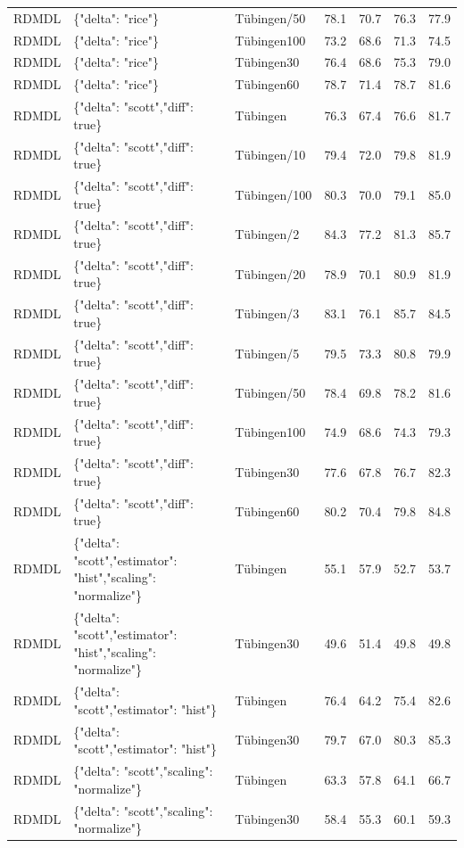 \begin{tabular}{lllllll}
RDMDL & \{"delta": "rice"\} & Tübingen/50 & 78.1 & 70.7 & 76.3 & 77.9 \\
RDMDL & \{"delta": "rice"\} & Tübingen100 & 73.2 & 68.6 & 71.3 & 74.5 \\
RDMDL & \{"delta": "rice"\} & Tübingen30 & 76.4 & 68.6 & 75.3 & 79.0 \\
RDMDL & \{"delta": "rice"\} & Tübingen60 & 78.7 & 71.4 & 78.7 & 81.6 \\
RDMDL & \{"delta": "scott","diff": true\} & Tübingen & 76.3 & 67.4 & 76.6 & 81.7 \\
RDMDL & \{"delta": "scott","diff": true\} & Tübingen/10 & 79.4 & 72.0 & 79.8 & 81.9 \\
RDMDL & \{"delta": "scott","diff": true\} & Tübingen/100 & 80.3 & 70.0 & 79.1 & 85.0 \\
RDMDL & \{"delta": "scott","diff": true\} & Tübingen/2 & 84.3 & 77.2 & 81.3 & 85.7 \\
RDMDL & \{"delta": "scott","diff": true\} & Tübingen/20 & 78.9 & 70.1 & 80.9 & 81.9 \\
RDMDL & \{"delta": "scott","diff": true\} & Tübingen/3 & 83.1 & 76.1 & 85.7 & 84.5 \\
RDMDL & \{"delta": "scott","diff": true\} & Tübingen/5 & 79.5 & 73.3 & 80.8 & 79.9 \\
RDMDL & \{"delta": "scott","diff": true\} & Tübingen/50 & 78.4 & 69.8 & 78.2 & 81.6 \\
RDMDL & \{"delta": "scott","diff": true\} & Tübingen100 & 74.9 & 68.6 & 74.3 & 79.3 \\
RDMDL & \{"delta": "scott","diff": true\} & Tübingen30 & 77.6 & 67.8 & 76.7 & 82.3 \\
RDMDL & \{"delta": "scott","diff": true\} & Tübingen60 & 80.2 & 70.4 & 79.8 & 84.8 \\
RDMDL & \{"delta": "scott","estimator": "hist","scaling": "normalize"\} & Tübingen & 55.1 & 57.9 & 52.7 & 53.7 \\
RDMDL & \{"delta": "scott","estimator": "hist","scaling": "normalize"\} & Tübingen30 & 49.6 & 51.4 & 49.8 & 49.8 \\
RDMDL & \{"delta": "scott","estimator": "hist"\} & Tübingen & 76.4 & 64.2 & 75.4 & 82.6 \\
RDMDL & \{"delta": "scott","estimator": "hist"\} & Tübingen30 & 79.7 & 67.0 & 80.3 & 85.3 \\
RDMDL & \{"delta": "scott","scaling": "normalize"\} & Tübingen & 63.3 & 57.8 & 64.1 & 66.7 \\
RDMDL & \{"delta": "scott","scaling": "normalize"\} & Tübingen30 & 58.4 & 55.3 & 60.1 & 59.3 \\

\end{tabular}
